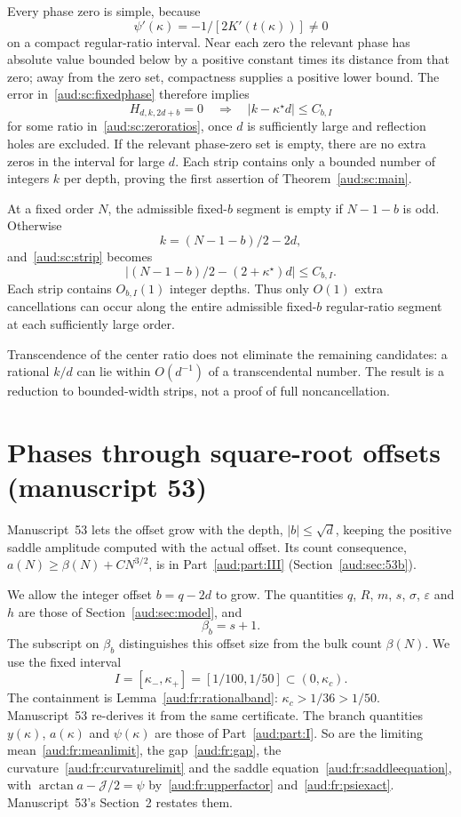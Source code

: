 \documentclass[11pt,a4paper]{article}
\numberwithin{equation}{section}
\begin{document}
Every phase zero is simple, because
\[
 \psi'(\kappa)=-1/[2K'(t(\kappa))]\ne0
\]
on a compact regular-ratio interval. Near each zero the relevant phase has absolute value bounded below by a positive constant times its distance from that zero; away from the zero set, compactness supplies a positive lower bound. The error in~\eqref{aud:sc:fixedphase} therefore implies
\begin{equation}\label{aud:sc:strip}
 H_{d,k,2d+b}=0\quad\Longrightarrow\quad
 |k-\kappa^\star d|\le C_{b,I}
\end{equation}
for some ratio in~\eqref{aud:sc:zeroratios}, once $d$ is sufficiently large and reflection holes are excluded. If the relevant phase-zero set is empty, there are no extra zeros in the interval for large $d$. Each strip contains only a bounded number of integers $k$ per depth, proving the first assertion of Theorem~\ref{aud:sc:main}.

At a fixed order $N$, the admissible fixed-$b$ segment is empty if $N-1-b$ is odd. Otherwise
\[
 k=(N-1-b)/2-2d,
\]
and~\eqref{aud:sc:strip} becomes
\[
 |(N-1-b)/2-(2+\kappa^\star)d|\le C_{b,I}.
\]
Each strip contains $O_{b,I}(1)$ integer depths. Thus only $O(1)$ extra cancellations can occur along the entire admissible fixed-$b$ regular-ratio segment at each sufficiently large order.

Transcendence of the center ratio does not eliminate the remaining candidates: a rational $k/d$ can lie within $O(d^{-1})$ of a transcendental number. The result is a reduction to bounded-width strips, not a proof of full noncancellation.
\section{Phases through square-root offsets (manuscript 53)}\label{aud:sec:53a}
Manuscript~53 lets the offset grow with the depth, $|b|\le\sqrt d$, keeping the positive saddle amplitude computed with the actual offset. Its count consequence, $a(N)\ge\beta(N)+CN^{3/2}$, is in Part~\ref{aud:part:III} (Section~\ref{aud:sec:53b}).

We allow the integer offset $b=q-2d$ to grow. The quantities $q$, $R$, $m$, $s$, $\sigma$, $\varepsilon$ and $h$ are those of Section~\ref{aud:sec:model}, and
\[
 \beta_b=s+1.
\]
The subscript on $\beta_b$ distinguishes this offset size from the bulk count $\beta(N)$. We use the fixed interval
\begin{equation}\label{aud:go:I}
 I=[\kappa_-,\kappa_+]=[1/100,1/50]\subset(0,\kappa_c).
\end{equation}
The containment is Lemma~\ref{aud:fr:rationalband}: $\kappa_c>1/36>1/50$. Manuscript~53 re-derives it from the same certificate. The branch quantities $y(\kappa)$, $a(\kappa)$ and $\psi(\kappa)$ are those of Part~\ref{aud:part:I}. So are the limiting mean~\eqref{aud:fr:meanlimit}, the gap~\eqref{aud:fr:gap}, the curvature~\eqref{aud:fr:curvaturelimit} and the saddle equation~\eqref{aud:fr:saddleequation}, with $\arctan a-\mathcal J/2=\psi$ by~\eqref{aud:fr:upperfactor} and~\eqref{aud:fr:psiexact}. Manuscript~53's Section~2 restates them.
\end{document}
